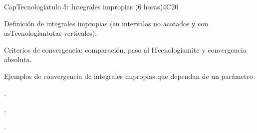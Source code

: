\begin{syllabus}
\begin{unit}{CapTecnologíatulo 5: Integrales impropias (6 horas)}{}{}{4}{C20}
\begin{topics}
	\item Definición de integrales impropias (en intervalos no acotados y con asTecnologíantotas verticales). 
    \item Criterios de convergencia: comparación, paso al lTecnologíamite y convergencia absoluta. 
    \item Ejemplos de convergencia de integrales impropias que dependan de un parámetro
   \end{topics}

   \begin{learningoutcomes}
      \item .
      \item .
      \item .
   \end{learningoutcomes}

\end{unit}



\begin{coursebibliography}
\end{coursebibliography}


\end{syllabus}
